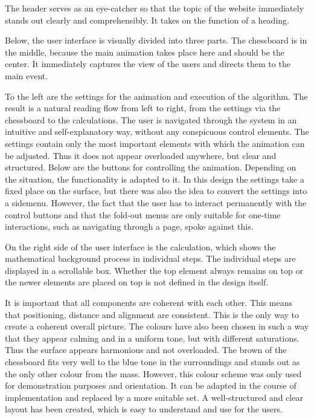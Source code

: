 The header serves as an eye-catcher so that the topic of the website immediately stands out clearly and comprehensibly. It takes on the function of a heading.

Below, the user interface is visually divided into three parts. The chessboard is in the middle, because the main animation takes place here and should be the center. It immediately captures the view of the users and directs them to the main event.

To the left are the settings for the animation and execution of the algorithm. The result is a natural reading flow from left to right, from the settings via the chessboard to the calculations. The user is navigated through the system in an intuitive and self-explanatory way, without any conspicuous control elements. The settings contain only the most important elements with which the animation can be adjusted. Thus it does not appear overloaded anywhere, but clear and structured. Below are the buttons for controlling the animation. Depending on the situation, the functionality is adapted to it. In this design the settings take a fixed place on the surface, but there was also the idea to convert the settings into a sidemenu. However, the fact that the user has to interact permanently with the control buttons and that the fold-out menus are only suitable for one-time interactions, such as navigating through a page, spoke against this.

On the right side of the user interface is the calculation, which shows the mathematical background process in individual steps. The individual steps are displayed in a scrollable box. Whether the top element always remains on top or the newer elements are placed on top is not defined in the design itself.

It is important that all components are coherent with each other. This means that positioning, distance and alignment are consistent. This is the only way to create a coherent overall picture. The colours have also been chosen in such a way that they appear calming and in a uniform tone, but with different saturations. Thus the surface appears harmonious and not overloaded. The brown of the chessboard fits very well to the blue tone in the surroundings and stands out as the only other colour from the mass. However, this colour scheme was only used for demonstration purposes and orientation. It can be adapted in the course of implementation and replaced by a more suitable set. A well-structured and clear layout has been created, which is easy to understand and use for the users.
